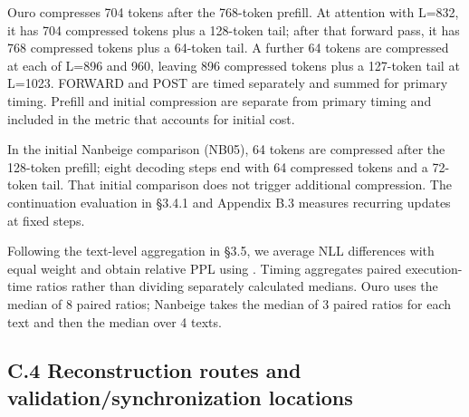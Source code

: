 \documentclass[10pt,a4paper]{article}
\begin{document}
Ouro compresses 704 tokens after the 768-token prefill. At attention with L=832, it has 704 compressed tokens plus a 128-token tail; after that forward pass, it has 768 compressed tokens plus a 64-token tail. A further 64 tokens are compressed at each of L=896 and 960, leaving 896 compressed tokens plus a 127-token tail at L=1023. FORWARD and POST are timed separately and summed for primary timing. Prefill and initial compression are separate from primary timing and included in the metric that accounts for initial cost.

In the initial Nanbeige comparison (NB05), 64 tokens are compressed after the 128-token prefill; eight decoding steps end with 64 compressed tokens and a 72-token tail. That initial comparison does not trigger additional compression. The continuation evaluation in §3.4.1 and Appendix B.3 measures recurring updates at fixed steps.

Following the text-level aggregation in §3.5, we average NLL differences with equal weight and obtain relative PPL using \texttt{}. Timing aggregates paired execution-time ratios rather than dividing separately calculated medians. Ouro uses the median of 8 paired ratios; Nanbeige takes the median of 3 paired ratios for each text and then the median over 4 texts.

\subsection{C.4 Reconstruction routes and validation/synchronization locations}\label{c.4-reconstruction-routes-and-validationsynchronization-locations}
\end{document}

